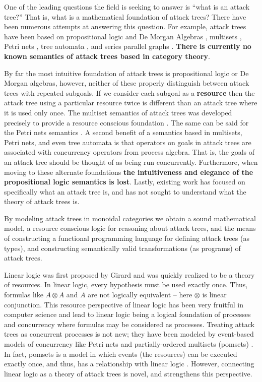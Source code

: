 \documentclass{sigplanconf}
\begin{document}
One of the leading questions the field is seeking to answer is ``what
is an attack tree?''  That is, what is a mathematical foundation of
attack trees? There have been numerous attempts at answering this
question.  For example, attack trees have been based on propositional
logic and De Morgan Algebras
\cite{Kordy:2014,Kordy:2012,Pietre-Cambacedes:2010}, multisets
\cite{Mauw:2006}, Petri nets \cite{McDermott:2001}, tree automata
\cite{Camtepe:2007}, and series parallel graphs
\cite{Jhawar:2015}. \textbf{There is currently no known semantics of
  attack trees based in category theory}.

By far the most intuitive foundation of attack trees is propositional
logic or De Morgan algebras, however, neither of these properly
distinguish between attack trees with repeated subgoals.  If we
consider each subgoal as a \textbf{resource} then the attack tree
using a particular resource twice is different than an attack tree
where it is used only once.  The multiset semantics of attack trees
was developed precisely to provide a resource conscious foundation
\cite{Mauw:2006}. The same can be said for the Petri nets semantics
\cite{McDermott:2001}.  A second benefit of a semantics based in
multisets, Petri nets, and even tree automata is that operators on
goals in attack trees are associated with concurrency operators from
process algebra.  That is, the goals of an attack tree should be
thought of as being run concurrently.  Furthermore, when moving to
these alternate foundations \textbf{the intuitiveness and elegance of
  the propositional logic semantics is lost}.  Lastly, existing work
has focused on specifically what an attack tree is, and has not sought
to understand what the theory of attack trees is.

By modeling attack trees in monoidal categories we obtain a sound
mathematical model, a resource conscious logic for reasoning about
attack trees, and the means of constructing a functional programming
language for defining attack trees (as types), and constructing
semantically valid transformations (as programs) of attack trees.

Linear logic was first proposed by Girard \cite{Girard:1987} and was
quickly realized to be a theory of resources.  In linear logic, every
hypothesis must be used exactly once.  Thus, formulas like $A \otimes
A$ and $A$ are not logically equivalent -- here $\otimes$ is linear
conjunction.  This resource perspective of linear logic has been very
fruitful in computer science and lead to linear logic being a logical
foundation of processes and concurrency where formulas may be
considered as processes.  Treating attack trees as concurrent
processes is not new; they have been modeled by event-based models of
concurrency like Petri nets and partially-ordered multisets (pomsets)
\cite{Jhawar:2015,Mauw:2006}.  In fact, pomsets is a model in which
events (the resources) can be executed exactly once, and thus, has a
relationship with linear logic \cite{Retore:1997}.  However,
connecting linear logic as a theory of attack trees is novel, and
strengthens this perspective.
\end{document}
